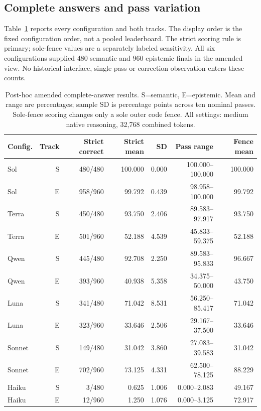 \documentclass[a4paper,preprint,12pt,numbers,nopreprintline]{elsarticle}
\begin{document}
\subsection{Complete answers and pass variation}
Table~\ref{tab:ten-pass-summary} reports every configuration and both tracks. The display order is the fixed configuration order, not a pooled leaderboard. The strict scoring rule is primary; sole-fence values are a separately labeled sensitivity. All six configurations supplied 480 semantic and 960 epistemic finals in the amended view. No historical interface, single-pass or correction observation enters these counts.
\begin{table}[htbp]\centering\scriptsize
\caption{Post-hoc amended complete-answer results. S=semantic, E=epistemic. Mean and range are percentages; sample SD is percentage points across ten nominal passes. Sole-fence scoring changes only a sole outer code fence. All settings: medium native reasoning, 32,768 combined tokens.}\label{tab:ten-pass-summary}
\setlength{\tabcolsep}{3pt}
\begin{tabular}{lrrrrrr}\toprule
Config. & Track & Strict correct & Strict mean & SD & Pass range & Fence mean\\\midrule
Sol & S & 480/480 & 100.000 & 0.000 & 100.000--100.000 & 100.000\\
Sol & E & 958/960 & 99.792 & 0.439 & 98.958--100.000 & 99.792\\
Terra & S & 450/480 & 93.750 & 2.406 & 89.583--97.917 & 93.750\\
Terra & E & 501/960 & 52.188 & 4.539 & 45.833--59.375 & 52.188\\
Qwen & S & 445/480 & 92.708 & 2.250 & 89.583--95.833 & 96.667\\
Qwen & E & 393/960 & 40.938 & 5.358 & 34.375--50.000 & 43.750\\
Luna & S & 341/480 & 71.042 & 8.531 & 56.250--85.417 & 71.042\\
Luna & E & 323/960 & 33.646 & 2.506 & 29.167--37.500 & 33.646\\
Sonnet & S & 149/480 & 31.042 & 3.860 & 27.083--39.583 & 31.042\\
Sonnet & E & 702/960 & 73.125 & 4.331 & 62.500--78.125 & 88.229\\
Haiku & S & 3/480 & 0.625 & 1.006 & 0.000--2.083 & 49.167\\
Haiku & E & 12/960 & 1.250 & 1.076 & 0.000--3.125 & 72.917\\
\bottomrule\end{tabular}
\end{table}
\end{document}
